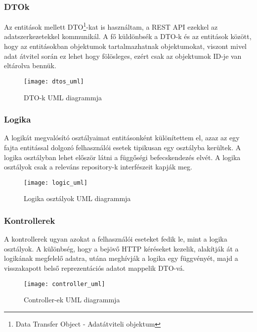 \clearpage

\subsubsection{DTOk}
Az entitások mellett DTO\footnote{Data Transfer Object - Adatátviteli objektum}-kat is használtam, a REST API ezekkel az adatszerkezetekkel kommunikál. A fő küldönbsék a DTO-k és az entitások között, hogy az entitásokban objektumok tartalmazhatnak objektumokat, viszont mivel adat átvitel során ez lehet hogy fölösleges, ezért csak az objektumok ID-je van eltárolva bennük.

\begin{figure}[H]
	\centering
	\texttt{[image: dtos\_uml]}
	\caption{DTO-k UML diagrammja}
	\label{fig:dtos}
\end{figure}

\clearpage

\subsubsection{Logika}
A logikát megvalósító osztályaimat entitásonként különítettem el, azaz az egy fajta entitással dolgozó felhasználói esetek tipikusan egy osztályba kerültek. A logika osztályban lehet először látni a függőségi befecskendezés elvét. A logika osztályok csak a releváns repository-k interfészeit kapják meg.

\begin{figure}[H]
	\centering
	\texttt{[image: logic\_uml]}
	\caption{Logika osztályok UML diagrammja}
	\label{fig:logic}
\end{figure}

\clearpage

\subsubsection{Kontrollerek}

A kontrollerek ugyan azokat a felhasználói eseteket fedik le, mint a logika osztályok. A különbség, hogy a bejövő HTTP kéréseket kezelik, alakítják át a logikának megfelelő adatra, utána meghívják a logika egy függvényét, majd a visszakapott belső reprezentációs adatot mappelik DTO-vá.

\begin{figure}[H]
	\centering
	\texttt{[image: controller\_uml]}
	\caption{Controller-ek UML diagrammja}
	\label{fig:controllers}
\end{figure}

